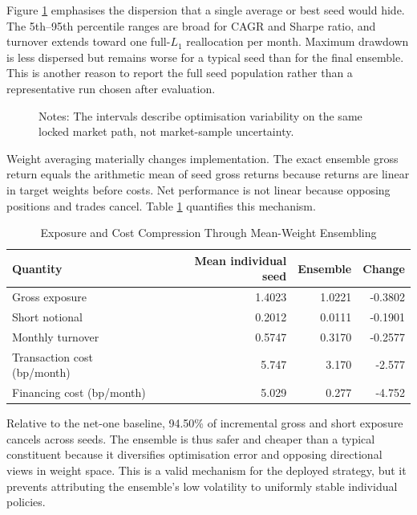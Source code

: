 Figure \ref{fig:primary_seed_robustness} emphasises the dispersion that a single average or best seed would hide. The 5th--95th percentile ranges are broad for CAGR and Sharpe ratio, and turnover extends toward one full-$L_1$ reallocation per month. Maximum drawdown is less dispersed but remains worse for a typical seed than for the final ensemble. This is another reason to report the full seed population rather than a representative run chosen after evaluation.

\begin{figure}[htbp]
\centering

\caption{Out-of-sample dispersion across the 20 frozen primary training seeds.
Dots identify individual seeds, boxes span the interquartile range, red lines
denote medians, and whiskers span the 5th--95th percentiles.}
\label{fig:primary_seed_robustness}
\caption*{\footnotesize Notes: The intervals describe optimisation variability on the same locked market path, not market-sample uncertainty.}
\end{figure}

Weight averaging materially changes implementation. The exact ensemble gross return equals the arithmetic mean of seed gross returns because returns are linear in target weights before costs. Net performance is not linear because opposing positions and trades cancel. Table \ref{tab:ensemble_cancellation} quantifies this mechanism.

\begin{table}[H]
\centering
\caption{Exposure and Cost Compression Through Mean-Weight Ensembling}
\label{tab:ensemble_cancellation}
\begin{tabular}{l r r r}
\toprule
\textbf{Quantity} & \textbf{Mean individual seed} & \textbf{Ensemble} & \textbf{Change} \\
\midrule
Gross exposure & 1.4023 & 1.0221 & -0.3802 \\
Short notional & 0.2012 & 0.0111 & -0.1901 \\
Monthly turnover & 0.5747 & 0.3170 & -0.2577 \\
Transaction cost (bp/month) & 5.747 & 3.170 & -2.577 \\
Financing cost (bp/month) & 5.029 & 0.277 & -4.752 \\
\bottomrule
\end{tabular}
\end{table}

Relative to the net-one baseline, 94.50\% of incremental gross and short exposure cancels across seeds. The ensemble is thus safer and cheaper than a typical constituent because it diversifies optimisation error and opposing directional views in weight space. This is a valid mechanism for the deployed strategy, but it prevents attributing the ensemble's low volatility to uniformly stable individual policies.

